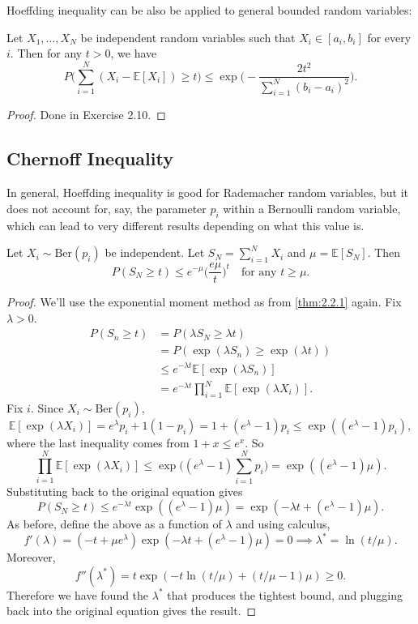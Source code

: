Hoeffding inequality can be also be applied to general bounded random variables: 
\begin{theorem}
\label{thm:2.2.6}
Let $X_1, \dots, X_N$ be independent random variables such that $X_i \in [a_i, b_i]$ for every $i$. Then 
for any $t > 0$, we have 
\[ P \biggl( \sum_{i = 1}^{N} (X_i - \mathbb{E}[X_i]) \geq t \biggr) 
\leq \exp{\biggl( -\frac{2t^2}{\sum_{i = 1}^{N} (b_i - a_i)^2} \biggr)}. \]
\end{theorem}

\begin{proof}
Done in Exercise 2.10.
\end{proof}


\subsection{Chernoff Inequality}
In general, Hoeffding inequality is good for Rademacher random variables, but it does not account for, say, 
the parameter $p_i$ within a Bernoulli random variable, which can lead to very different results depending 
on what this value is.

\begin{theorem}
\label{thm:2.3.1}
Let $X_i \sim \text{Ber}(p_i)$ be independent. Let $S_N = \sum_{i = 1}^{N} X_i$ and $\mu = \mathbb{E}[S_N]$. 
Then 
\[ P(S_N \geq t) \leq e^{-\mu} \biggl( \frac{e \mu}{t} \biggr)^t \quad \text{for any } t \geq \mu. \]
\end{theorem}

\begin{proof}
We'll use the exponential moment method as from \cref{thm:2.2.1} again. Fix $\lambda > 0$.
\begin{align*}
	P(S_n \geq t) 
	&= P(\lambda S_N \geq \lambda t) \\
	&= P(\exp{(\lambda S_n)} \geq \exp{(\lambda t)}) \\
	&\leq e^{-\lambda t} \mathbb{E}[\exp{(\lambda S_n)}] \\
	&= e^{-\lambda t} \prod_{i = 1}^{N} \mathbb{E}[\exp{(\lambda X_i)}]. 
\end{align*}
Fix $i$. Since $X_i \sim \text{Ber}(p_i)$, 
\[ \mathbb{E}[\exp{(\lambda X_i)}] = e^{\lambda} p_i + 1(1 - p_i) 
= 1 + (e^\lambda - 1)p_i \leq \exp{((e^\lambda - 1) p_i)}, \]
where the last inequality comes from $1 + x \leq e^x$. So 
\[ \prod_{i = 1}^{N} \mathbb{E}[\exp{(\lambda X_i)}] \leq \exp{ \biggl( 
(e^\lambda - 1) \sum_{i = 1}^{N} p_i \biggr)} = \exp{((e^\lambda - 1)\mu)}. \]
Substituting back to the original equation gives 
\[ P(S_N \geq t) \leq e^{-\lambda t} \exp{((e^\lambda - 1)\mu)} 
= \exp{(-\lambda t + (e^\lambda - 1)\mu)}. \]
As before, define the above as a function of $\lambda$ and using calculus, 
\[ f'(\lambda) = (-t + \mu e^\lambda)\exp{(-\lambda t + (e^\lambda - 1)\mu)} = 0 
\implies \lambda^* = \ln{(t / \mu)}. \]
Moreover, 
\[ f''(\lambda^*) = t\exp{(-t \ln{(t / \mu)} + (t / \mu - 1)\mu)} \geq 0. \]
Therefore we have found the $\lambda^*$ that produces the tightest bound, and plugging back into the 
original equation gives the result.
\end{proof}

